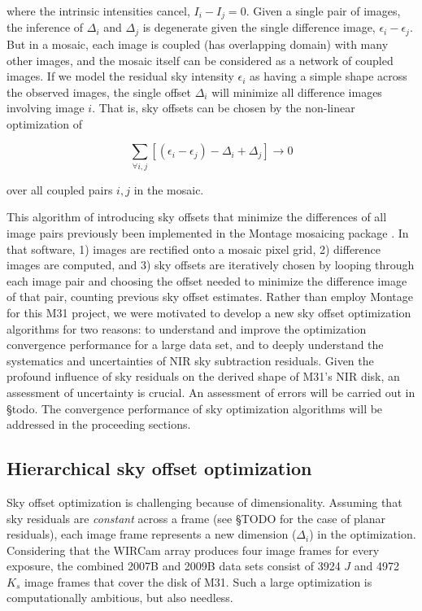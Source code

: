 \documentclass[iop]{emulateapj}
\newcommand{\todo}[1]{\textcolor{RedOrange}{#1}} %
\begin{document}
\noindent where the intrinsic intensities cancel, $I_i - I_j = 0$. Given a single pair of images, the inference of $\Delta_i$ and $\Delta_j$ is degenerate given the single difference image, $\epsilon_i-\epsilon_j$. But in a mosaic, each image is coupled (has overlapping domain) with many other images, and the mosaic itself can be considered as a network of coupled images. If we model the residual sky intensity $\epsilon_i$ as having a simple shape across the observed images, the single offset $\Delta_i$ will minimize all difference images involving image $i$. That is, sky offsets can be chosen by the non-linear optimization of

\begin{equation}
    \sum_{\forall i,j} [(\epsilon_i - \epsilon_j) - \Delta_i + \Delta_j] \rightarrow 0
    \label{eq:scalartheoryobj}
\end{equation}

\noindent over all coupled pairs $i,j$ in the mosaic.

This algorithm of introducing sky offsets that minimize the differences of all image pairs previously been implemented in the Montage mosaicing package \citep{Berriman:2008}. In that software, 1) images are rectified onto a mosaic pixel grid, 2) difference images are computed, and 3) sky offsets are iteratively chosen by looping through each image pair and choosing the offset needed to minimize the difference image of that pair, counting previous sky offset estimates. Rather than employ Montage for this M31 project, we were motivated to develop a new sky offset optimization algorithms for two reasons: to understand and improve the optimization convergence performance for a large data set, and to deeply understand the systematics and uncertainties of NIR sky subtraction residuals. Given the profound influence of sky residuals on the derived shape of M31's NIR disk, an assessment of uncertainty is crucial. An assessment of errors will be carried out in \todo{\S todo}. The convergence performance of sky optimization algorithms will be addressed in the proceeding sections.

\subsection{Hierarchical sky offset optimization}

Sky offset optimization is challenging because of dimensionality. Assuming that sky residuals are \emph{constant} across a frame (see \S TODO for the case of planar residuals), each image frame represents a new dimension ($\Delta_i$) in the optimization. Considering that the WIRCam array produces four image frames for every exposure, the combined 2007B and 2009B data sets consist of 3924 $J$ and 4972 $K_s$ image frames that cover the disk of M31. Such a large optimization is computationally ambitious, but also needless.
\end{document}
